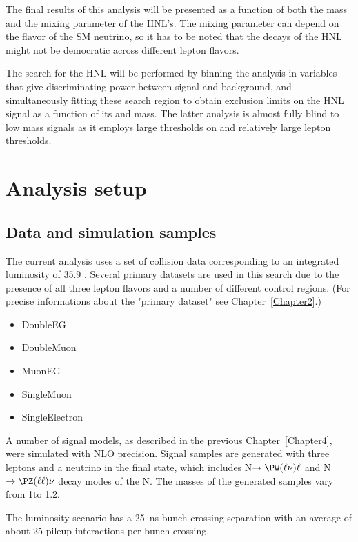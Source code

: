 The final results of this analysis will be presented as a function of both the mass and the mixing parameter of the HNL's. 
The mixing parameter can depend on the flavor of the SM neutrino, so it has to be noted that the decays of the HNL 
might not be democratic across different lepton flavors.

The search for the HNL will be performed by binning the analysis in
variables that give discriminating power between signal and
background, and simultaneously fitting these search region to obtain
exclusion limits on the HNL signal as a function of its \mixpar and
mass. The latter analysis is almost fully blind to low mass signals as
it employs large thresholds on \met and relatively large lepton \pt
thresholds.



\section{Analysis setup}
\subsection{Data and simulation samples}
The current analysis uses a set of \Pp collision data corresponding to
an integrated luminosity of 35.9 \fbinv. Several primary datasets are used in this search due to the presence of all three
lepton flavors and a number of different control regions. (For precise
informations about the "primary dataset" see Chapter~\ref{Chapter2}.)

{\footnotesize
\begin{itemize}
\item DoubleEG
\item DoubleMuon
\item MuonEG
\item SingleMuon
\item SingleElectron
\end{itemize} }

A number of signal models, as described in the previous
Chapter~\ref{Chapter4}, were simulated with NLO precision. Signal
samples are generated with three leptons and a neutrino in the final
state, which includes N$\to\PW(\ell\nu)\ell$ and
N$\to\PZ(\ell\ell)\nu$ decay modes of the N. The \hnl masses of the
generated samples vary from 1\GeV to 1.2\TeV. 

The luminosity scenario has a 25~ns bunch crossing separation with an average of about 25 pileup interactions per bunch crossing.

